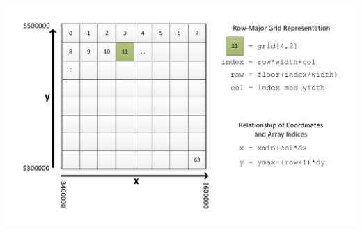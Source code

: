 \documentclass[12pt,oneside,a4paper]{article}
\begin{document}
\begin{center}
	\includegraphics[scale=0.65]{grid.pdf}
\end{center}




 
  
  
\end{document}
